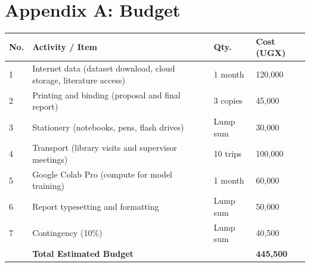 \documentclass[11pt,letterpaper]{article}
\begin{document}
\newpage
\renewcommand{\refname}{References}
{\scriptsize
}

\newpage
\appendix

{\small
\section*{Appendix A: Budget}
\vspace{0.3em}
\begin{center}
\begin{tabular}{p{0.6cm}p{7.8cm}p{2.2cm}p{2.2cm}}
\toprule
\textbf{No.} & \textbf{Activity / Item} & \textbf{Qty.} & \textbf{Cost (UGX)} \\
\midrule
1 & Internet data (dataset download, cloud storage, literature access) & 1 month  & 120,000 \\
2 & Printing and binding (proposal and final report)                   & 3 copies & 45,000  \\
3 & Stationery (notebooks, pens, flash drives)                        & Lump sum & 30,000  \\
4 & Transport (library visits and supervisor meetings)                 & 10 trips & 100,000 \\
5 & Google Colab Pro (compute for model training)                     & 1 month  & 60,000  \\
6 & Report typesetting and formatting                                  & Lump sum & 50,000  \\
7 & Contingency (10\%)                                                 & Lump sum & 40,500  \\
\midrule
  & \textbf{Total Estimated Budget}                                   &          & \textbf{445,500} \\
\bottomrule
\end{tabular}
\end{center}

\vspace{1em}
}
\end{document}
